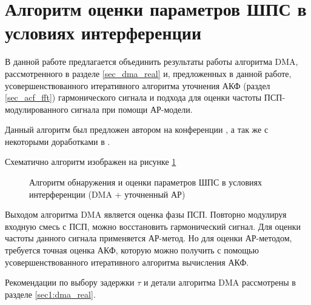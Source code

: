 \section{Алгоритм оценки параметров ШПС в условиях интерференции}
\label{l:ssec3_dma_lpc_algo}

В данной работе предлагается объединить результаты работы алгоритма DMA, рассмотренного в разделе
\ref{sec_dma_real} и, предложенных в данной работе, усовершенствованного итеративного 
алгоритма уточнения АКФ (раздел \ref{sec_acf_fft}) гармонического сигнала и 
подхода для оценки частоты ПСП-модулированного сигнала при помощи АР-модели.

Данный алгоритм был предложен автором на конференции \cite{my_dma_ar}, а так же с некоторыми доработками в \cite{my_otchet}.

Схематично алгоритм изображен на рисунке \ref{pic4:dma_quadruple_lpc}

\begin{figure}[h]
\center{}
	\caption{Алгоритм обнаружения и оценки параметров ШПС в условиях интерференции (DMA + уточненный АР)}
	\label{pic4:dma_quadruple_lpc}
\end{figure}

Выходом алгоритма DMA является оценка фазы ПСП. Повторно модулируя входную смесь с ПСП, можно восстановить гармонический сигнал. Для оценки частоты данного сигнала применяется
АР-метод. Но для оценки АР-методом, требуется точная оценка АКФ, которую можно получить
с помощью усовершенствованного итеративного алгоритма вычисления АКФ.

Рекомендации по выбору задержки ${\tau}$ и детали алгоритма DMA рассмотрены в разделе
\ref{sec1:dma_real}.

